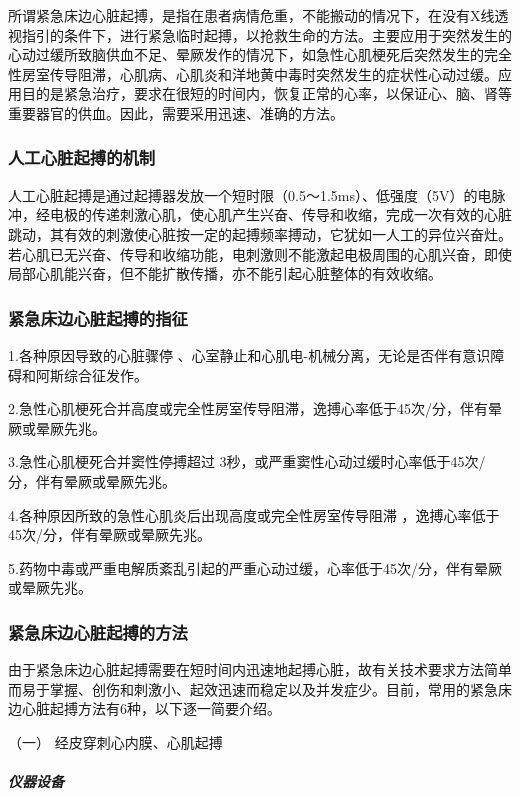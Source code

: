 所谓紧急床边心脏起搏，是指在患者病情危重，不能搬动的情况下，在没有X线透视指引的条件下，进行紧急临时起搏，以抢救生命的方法。主要应用于突然发生的心动过缓所致脑供血不足、晕厥发作的情况下，如急性心肌梗死后突然发生的完全性房室传导阻滞，心肌病、心肌炎和洋地黄中毒时突然发生的症状性心动过缓。应用目的是紧急治疗，要求在很短的时间内，恢复正常的心率，以保证心、脑、肾等重要器官的供血。因此，需要采用迅速、准确的方法。

\subsubsection{人工心脏起搏的机制}

人工心脏起搏是通过起搏器发放一个短时限（0.5～1.5ms）、低强度（5V）的电脉冲，经电极的传递刺激心肌，使心肌产生兴奋、传导和收缩，完成一次有效的心脏跳动，其有效的刺激使心脏按一定的起搏频率搏动，它犹如一人工的异位兴奋灶。若心肌已无兴奋、传导和收缩功能，电刺激则不能激起电极周围的心肌兴奋，即使局部心肌能兴奋，但不能扩散传播，亦不能引起心脏整体的有效收缩。

\subsubsection{紧急床边心脏起搏的指征}

1.各种原因导致的心脏骤停
、心室静止和心肌电-机械分离，无论是否伴有意识障碍和阿斯综合征发作。

2.急性心肌梗死合并高度或完全性房室传导阻滞，逸搏心率低于45次/分，伴有晕厥或晕厥先兆。

3.急性心肌梗死合并窦性停搏超过
3秒，或严重窦性心动过缓时心率低于45次/分，伴有晕厥或晕厥先兆。

4.各种原因所致的急性心肌炎后出现高度或完全性房室传导阻滞
，逸搏心率低于45次/分，伴有晕厥或晕厥先兆。

5.药物中毒或严重电解质紊乱引起的严重心动过缓，心率低于45次/分，伴有晕厥或晕厥先兆。

\subsubsection{紧急床边心脏起搏的方法}

由于紧急床边心脏起搏需要在短时间内迅速地起搏心脏，故有关技术要求方法简单而易于掌握、创伤和刺激小、起效迅速而稳定以及并发症少。目前，常用的紧急床边心脏起搏方法有6种，以下逐一简要介绍。

\hypertarget{text00375.htmlux5cux23CHP16-5-3-1}{}
（一） 经皮穿刺心内膜、心肌起搏

\subparagraph{仪器设备}

